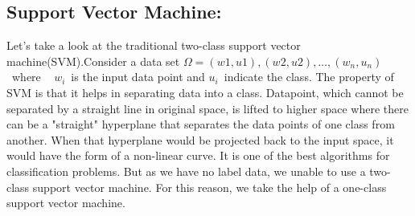 \documentclass[runningheads]{llncs}
\begin{document}
\subsection{\textbf{Support Vector Machine:}}
{Let's take a look at the traditional two-class support vector machine(SVM).Consider a data set $Ω={(w1,u1),(w2,u2) ,…,(w_n,u_n)}$\;\\ ~where ~ $w_i$\ is the input data point and $u_i$\ indicate the class. The property of SVM is that it helps in separating data into a class. Datapoint, which cannot be separated by a straight line in original space, is lifted to higher space where there can be a "straight" hyperplane that separates the data points of one class from another. When that hyperplane would be projected back to the input space, it would have the form of a non-linear curve. It is one of the best algorithms for classification problems. But as we have no label data, we unable to use a two-class support vector machine. For this reason, we take the help of a one-class support vector machine.

\par
\newline
\begin{table}[htb]
\centering
\caption{Few example of Feature Extraction for one class SVM }
\label{}
\end{table}}
\end{document}
